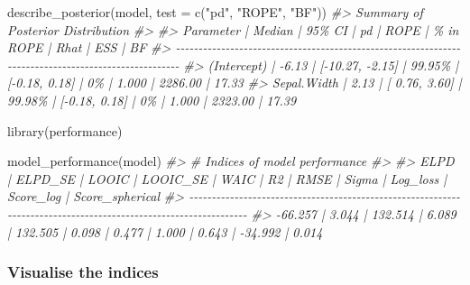 \documentclass[10pt,a4paper,onecolumn]{article}
\newenvironment{Shaded}{\begin{snugshade}}{\end{snugshade}}
\newcommand{\AttributeTok}[1]{\textcolor[rgb]{0.77,0.63,0.00}{#1}}
\newcommand{\CommentTok}[1]{\textcolor[rgb]{0.56,0.35,0.01}{\textit{#1}}}
\newcommand{\FunctionTok}[1]{\textcolor[rgb]{0.00,0.00,0.00}{#1}}
\newcommand{\NormalTok}[1]{#1}
\newcommand{\StringTok}[1]{\textcolor[rgb]{0.31,0.60,0.02}{#1}}
\begin{document}
\begin{Shaded}
\begin{Highlighting}[]
\FunctionTok{describe\_posterior}\NormalTok{(model, }\AttributeTok{test =} \FunctionTok{c}\NormalTok{(}\StringTok{"pd"}\NormalTok{, }\StringTok{"ROPE"}\NormalTok{, }\StringTok{"BF"}\NormalTok{))}
\CommentTok{\#\textgreater{} Summary of Posterior Distribution}
\CommentTok{\#\textgreater{} }
\CommentTok{\#\textgreater{} Parameter   | Median |          95\% CI |     pd |          ROPE | \% in ROPE |  Rhat |     ESS |    BF}
\CommentTok{\#\textgreater{} {-}{-}{-}{-}{-}{-}{-}{-}{-}{-}{-}{-}{-}{-}{-}{-}{-}{-}{-}{-}{-}{-}{-}{-}{-}{-}{-}{-}{-}{-}{-}{-}{-}{-}{-}{-}{-}{-}{-}{-}{-}{-}{-}{-}{-}{-}{-}{-}{-}{-}{-}{-}{-}{-}{-}{-}{-}{-}{-}{-}{-}{-}{-}{-}{-}{-}{-}{-}{-}{-}{-}{-}{-}{-}{-}{-}{-}{-}{-}{-}{-}{-}{-}{-}{-}{-}{-}{-}{-}{-}{-}{-}{-}{-}{-}{-}{-}{-}{-}{-}{-}}
\CommentTok{\#\textgreater{} (Intercept) |  {-}6.13 | [{-}10.27, {-}2.15] | 99.95\% | [{-}0.18, 0.18] |        0\% | 1.000 | 2286.00 | 17.33}
\CommentTok{\#\textgreater{} Sepal.Width |   2.13 | [  0.76,  3.60] | 99.98\% | [{-}0.18, 0.18] |        0\% | 1.000 | 2323.00 | 17.39}
\end{Highlighting}
\end{Shaded}

\begin{Shaded}
\begin{Highlighting}[]
\FunctionTok{library}\NormalTok{(performance)}

\FunctionTok{model\_performance}\NormalTok{(model)}
\CommentTok{\#\textgreater{} \# Indices of model performance}
\CommentTok{\#\textgreater{} }
\CommentTok{\#\textgreater{} ELPD    | ELPD\_SE |   LOOIC | LOOIC\_SE |    WAIC |    R2 |  RMSE | Sigma | Log\_loss | Score\_log | Score\_spherical}
\CommentTok{\#\textgreater{} {-}{-}{-}{-}{-}{-}{-}{-}{-}{-}{-}{-}{-}{-}{-}{-}{-}{-}{-}{-}{-}{-}{-}{-}{-}{-}{-}{-}{-}{-}{-}{-}{-}{-}{-}{-}{-}{-}{-}{-}{-}{-}{-}{-}{-}{-}{-}{-}{-}{-}{-}{-}{-}{-}{-}{-}{-}{-}{-}{-}{-}{-}{-}{-}{-}{-}{-}{-}{-}{-}{-}{-}{-}{-}{-}{-}{-}{-}{-}{-}{-}{-}{-}{-}{-}{-}{-}{-}{-}{-}{-}{-}{-}{-}{-}{-}{-}{-}{-}{-}{-}{-}{-}{-}{-}{-}{-}{-}{-}{-}{-}{-}{-}}
\CommentTok{\#\textgreater{} {-}66.257 |   3.044 | 132.514 |    6.089 | 132.505 | 0.098 | 0.477 | 1.000 |    0.643 |   {-}34.992 |           0.014}
\end{Highlighting}
\end{Shaded}

\hypertarget{visualise-the-indices}{%
\subsubsection{Visualise the indices}\label{visualise-the-indices}}
\end{document}
